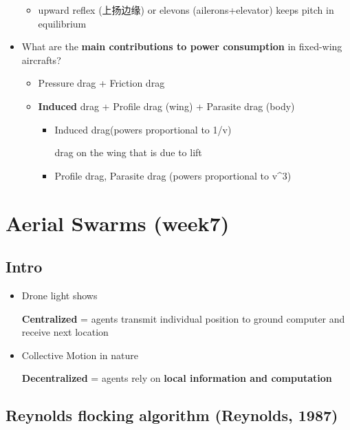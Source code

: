 \documentclass[]{article}
\begin{document}
\begin{itemize}
  \begin{itemize}
  \item
    upward reflex (上扬边缘) or elevons (ailerons+elevator) keeps pitch
    in equilibrium
  \end{itemize}
\item
  What are the \textbf{main contributions to power consumption} in
  fixed-wing aircrafts?

  \begin{itemize}
  \item
    Pressure drag + Friction drag
  \item
    \textbf{Induced} drag + Profile drag (wing) + Parasite drag (body)

    \begin{itemize}
    \item
      Induced drag(powers proportional to 1/v)

      drag on the wing that is due to lift
    \item
      Profile drag, Parasite drag (powers proportional to v\^{}3) 
    \end{itemize}
  \end{itemize}
\end{itemize}

\section{Aerial Swarms (week7)}\label{header-n1247}

\subsection{Intro}\label{header-n1248}

\begin{itemize}
\item
  Drone light shows

  \textbf{Centralized} = agents transmit individual position to ground
  computer and receive next location
\item
  Collective Motion in nature

  \textbf{Decentralized} = agents rely on \textbf{local information and
  computation}
\end{itemize}

\subsection{Reynolds flocking algorithm (Reynolds,
1987)}\label{header-n1256}
\end{document}
